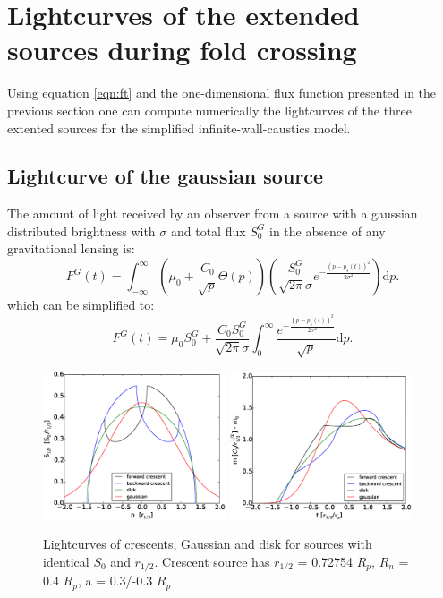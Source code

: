 \section{Lightcurves of the extended sources during fold crossing}

Using equation \ref{eqn:ft} and the one-dimensional flux function presented in the previous section one can compute numerically the lightcurves of the three extented sources for the simplified 
infinite-wall-caustics model.

\subsection{Lightcurve of the gaussian source}

The amount of light received by an observer from a source with a gaussian distributed brightness with $\sigma$ and total flux $S_0^G$ in the absence of any gravitational lensing is:
\begin{equation}
 F^G(t) = \int_{-\infty}^\infty  \left( \mu_0 + \frac{C_0}{\sqrt{p}} \Theta \left( p \right) \right) \left( \frac{S_0^G}{\sqrt{2 \pi} \sigma} e^{-\frac{(p-p_s(t))^2}{2 \sigma^2}} \right) \mathrm{d}p.
\end{equation}
which can be simplified to:
\begin{equation}
 F^G(t) = \mu_0 S_0^G + \frac{C_0 S_0^G}{\sqrt{2\pi} \sigma} \int_{0}^\infty \frac{e^{-\frac{(p-p_s(t))^2}{2 \sigma^2}}}{\sqrt{p}} \mathrm{d}p.
\end{equation}

\begin{figure}
\centering
	\includegraphics[width = 0.48\textwidth]{plots/S1D_all.eps}
	\includegraphics[width = 0.48\textwidth]{plots/4source_magnification.eps}
\caption{\label{fig:lightcurve_gauss} Lightcurves of crescents, Gaussian and disk for sources with identical $S_0$ and $r_{1/2}$. Crescent source has $r_{1/2}$ = 0.72754 $R_p$, $R_n$ = 0.4 $R_p$, a = 0.3/-0.3 $R_p$ }
\end{figure}


